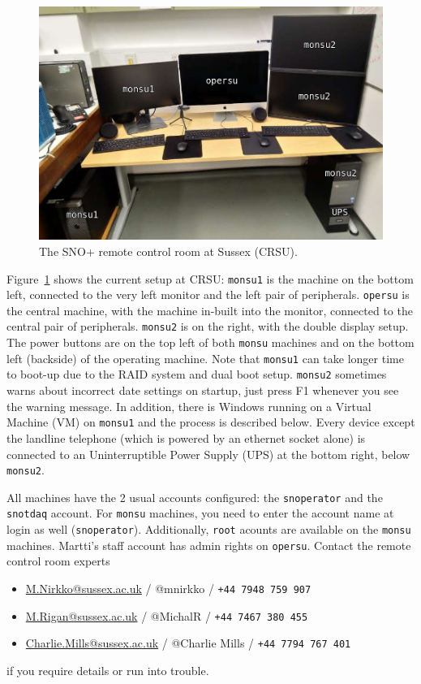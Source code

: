\documentclass[12pt, a4paper]{article}
\begin{document}
\begin{figure}[htp]
	\centering
	\includegraphics[width=\textwidth]{images/CRSU_final}
	\caption{The SNO+ remote control room at Sussex (CRSU).}
	\label{crsu_setup}
\end{figure}

Figure~\ref{crsu_setup} shows the current setup at CRSU: {\tt monsu1} is the machine on the bottom left, connected to the very left monitor and the left pair of peripherals. {\tt opersu} is the central machine, with the machine in-built into the monitor, connected to the central pair of peripherals. {\tt monsu2} is on the right, with the double display setup. The power buttons are on the top left of both {\tt monsu} machines and on the bottom left (backside) of the operating machine. Note that {\tt monsu1} can take longer time to boot-up due to the RAID system and dual boot setup. {\tt monsu2} sometimes warns about incorrect date settings on startup, just press F1 whenever you see the warning message. In addition, there is Windows running on a Virtual Machine (VM) on {\tt monsu1} and the process is described below. Every device except the landline telephone (which is powered by an ethernet socket alone) is connected to an Uninterruptible Power Supply (UPS) at the bottom right, below {\tt monsu2}.

All machines have the 2 usual accounts configured: the {\tt snoperator} and the {\tt snotdaq} account. For {\tt monsu} machines, you need to enter the account name at login as well ({\tt snoperator}). Additionally, {\tt root} acounts are available on the {\tt monsu} machines. Martti's staff account has admin rights on {\tt opersu}. Contact the remote control room experts
\begin{itemize}
\item \href{mailto:M.Nirkko@sussex.ac.uk}{M.Nirkko@sussex.ac.uk} / @mnirkko / {\tt +44 7948 759 907}
\item \href{mailto:M.Rigan@sussex.ac.uk}{M.Rigan@sussex.ac.uk} / @MichalR / {\tt +44 7467 380 455}
\item \href{mailto:Charlie.Mills@sussex.ac.uk}{Charlie.Mills@sussex.ac.uk} / @Charlie Mills / {\tt +44 7794 767 401}
\end{itemize}
if you require details or run into trouble.
\end{document}
